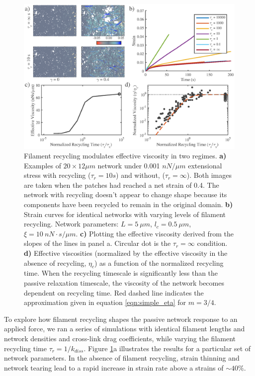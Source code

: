 \documentclass[10pt,letterpaper]{article}
\begin{document}
\begin{figure}[h!]
	\centering
	\includegraphics[width=\hsize]{figures/figure5a}
	\caption{\label{fig:passive_rec}  Filament recycling modulates effective viscosity in two regimes. \textbf{a)} Examples of $20 \times 12 \mu m$ network under 0.001 $nN/\mu m$ extensional stress with recycling ($\tau_r=10 s$) and without, ($\tau_r=\infty$).  Both images are taken when the patches had reached a net strain of 0.4.  The network with recycling doesn't appear to change shape because its components have been recycled to remain in the original domain. \textbf{b)} Strain curves for identical networks with varying levels of filament recycling.  Network parameters: $L=5\: \mu m$, $l_c=0.5\: \mu m$, $\xi=10\: nN\cdot s/\mu m$. \textbf{c)}  Plotting the effective viscosity derived from the slopes of the lines in panel a.  Circular dot is the $\tau_r=\infty$ condition.  \textbf{d)} Effective viscosities (normalized by the effective viscosity in the absence of recycling, $\eta_c$) as a function of the normalized recycling time. When the recycling timescale is significantly less than the passive relaxation timescale, the viscosity of the network becomes dependent on recycling time. Red dashed line indicates the approximation given in equation \ref{eqn:simple_eta} for $m=3/4$.}
\end{figure}

To explore how filament recycling shapes the passive network response to an applied force, we ran a series of simulations with identical filament lengths and network densities and cross-link drag coefficients, while varying the filament recycling time $\tau_r=1/k_{diss}$. Figure \ref{fig:passive_rec}a illustrates the results for a particular set of network parameters. In the absence of filament recycling, strain thinning and network tearing lead to a rapid increase in strain rate above a strains of $\sim40\%$. 
\end{document}
